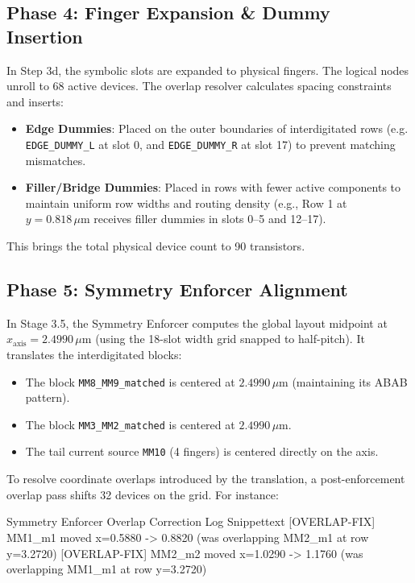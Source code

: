 \subsection{Phase 4: Finger Expansion \& Dummy Insertion}
In Step 3d, the symbolic slots are expanded to physical fingers. The logical nodes unroll to 68 active devices. The overlap resolver calculates spacing constraints and inserts:
\begin{itemize}
    \item \textbf{Edge Dummies}: Placed on the outer boundaries of interdigitated rows (e.g. \texttt{EDGE\_DUMMY\_L} at slot 0, and \texttt{EDGE\_DUMMY\_R} at slot 17) to prevent matching mismatches.
    \item \textbf{Filler/Bridge Dummies}: Placed in rows with fewer active components to maintain uniform row widths and routing density (e.g., Row 1 at $y=0.818\,\mu\text{m}$ receives filler dummies in slots 0--5 and 12--17).
\end{itemize}
This brings the total physical device count to 90 transistors.

\subsection{Phase 5: Symmetry Enforcer Alignment}
In Stage 3.5, the Symmetry Enforcer computes the global layout midpoint at $x_{\text{axis}} = 2.4990\,\mu\text{m}$ (using the 18-slot width grid snapped to half-pitch). It translates the interdigitated blocks:
\begin{itemize}
    \item The block \texttt{MM8\_MM9\_matched} is centered at $2.4990\,\mu\text{m}$ (maintaining its ABAB pattern).
    \item The block \texttt{MM3\_MM2\_matched} is centered at $2.4990\,\mu\text{m}$.
    \item The tail current source \texttt{MM10} (4 fingers) is centered directly on the axis.
\end{itemize}
To resolve coordinate overlaps introduced by the translation, a post-enforcement overlap pass shifts 32 devices on the grid. For instance:
\begin{thesiscode}{Symmetry Enforcer Overlap Correction Log Snippet}{text}
[OVERLAP-FIX] MM1_m1 moved x=0.5880 -> 0.8820 (was overlapping MM2_m1 at row y=3.2720)
[OVERLAP-FIX] MM2_m2 moved x=1.0290 -> 1.1760 (was overlapping MM1_m1 at row y=3.2720)
\end{thesiscode}

